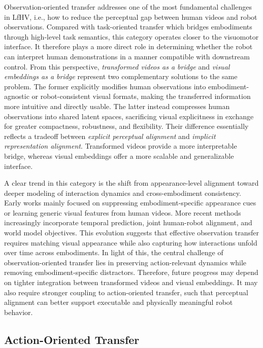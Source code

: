 \documentclass[Afour,sageh,times]{sagej}
\begin{document}
Observation-oriented transfer addresses one of the most fundamental challenges in LfHV, i.e., how to reduce the perceptual gap between human videos and robot observations. Compared with task-oriented transfer which bridges embodiments through high-level task semantics, this category operates closer to the visuomotor interface. It therefore plays a more direct role in determining whether the robot can interpret human demonstrations in a manner compatible with downstream control. From this perspective, \textit{transformed videos as a bridge} and \textit{visual embeddings as a bridge} represent two complementary solutions to the same problem. The former explicitly modifies human observations into embodiment-agnostic or robot-consistent visual formats, making the transferred information more intuitive and directly usable. The latter instead compresses human observations into shared latent spaces, sacrificing visual explicitness in exchange for greater compactness, robustness, and flexibility. Their difference essentially reflects a tradeoff between \textit{explicit perceptual alignment} and \textit{implicit representation alignment}. Transformed videos provide a more interpretable bridge, whereas visual embeddings offer a more scalable and generalizable interface.

A clear trend in this category is the shift from appearance-level alignment toward deeper modeling of interaction dynamics and cross-embodiment consistency. Early works mainly focused on suppressing embodiment-specific appearance cues or learning generic visual features from human videos. More recent methods increasingly incorporate temporal prediction, joint human-robot alignment, and world model objectives. This evolution suggests that effective observation transfer requires matching visual appearance while also capturing how interactions unfold over time across embodiments. In light of this, the central challenge of observation-oriented transfer lies in preserving action-relevant dynamics while removing embodiment-specific distractors. Therefore, future progress may depend on tighter integration between transformed videos and visual embeddings. It may also require stronger coupling to action-oriented transfer, such that perceptual alignment can better support executable and physically meaningful robot behavior.





\subsection{Action-Oriented Transfer}
\end{document}
